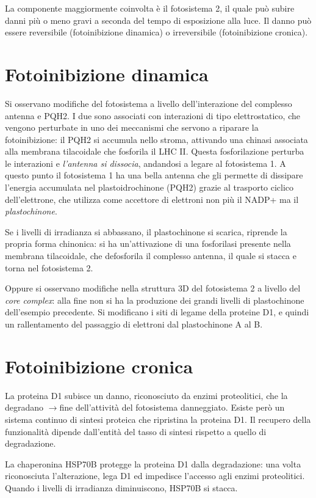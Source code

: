 \documentclass[a4paper,12pt]{book}
\newcommand{\lfreccia}{\ensuremath{\longrightarrow}}
\begin{document}
La componente maggiormente coinvolta è il fotosistema 2, il quale può subire danni più o meno gravi a seconda del tempo di esposizione alla luce. Il danno può essere reversibile (fotoinibizione dinamica) o irreversibile (fotoinibizione cronica).

\section{Fotoinibizione dinamica}
Si osservano modifiche del fotosistema a livello dell'interazione del complesso antenna e PQH2. I due sono associati con interazioni di tipo elettrostatico, che vengono perturbate in uno dei meccanismi che servono a riparare la fotoinibizione: il PQH2 si accumula nello stroma, attivando una chinasi associata alla membrana tilacoidale che fosforila il LHC II. Questa fosforilazione perturba le interazioni e \emph{l'antenna si dissocia}, andandosi a legare al fotosistema 1. A questo punto il fotosistema 1 ha una bella antenna che gli permette di dissipare l'energia accumulata nel plastoidrochinone (PQH2) grazie al trasporto ciclico dell'elettrone, che utilizza come accettore di elettroni non più il NADP+ ma il \emph{plastochinone}.

Se i livelli di irradianza si abbassano, il plastochinone si scarica, riprende la propria forma chinonica: si ha un'attivazione di una fosforilasi presente nella membrana tilacoidale, che defosforila il complesso antenna, il quale si stacca e torna nel fotosistema 2.

Oppure si osservano modifiche nella struttura 3D del fotosistema 2 a livello del \emph{core complex}: alla fine non si ha la produzione dei grandi livelli di plastochinone dell'esempio precedente. Si modificano i siti di legame della proteine D1, e quindi un rallentamento del passaggio di elettroni dal plastochinone A al B.

\section{Fotoinibizione cronica}
La proteina D1 subisce un danno, riconosciuto da enzimi proteolitici, che la degradano \lfreccia fine dell'attività del fotosistema danneggiato. Esiste però un sistema continuo di sintesi proteica che ripristina la proteina D1. Il recupero della funzionalità dipende dall'entità del tasso di sintesi rispetto a quello di degradazione.

La chaperonina HSP70B protegge la proteina D1 dalla degradazione: una volta riconosciuta l'alterazione, lega D1 ed impedisce l'accesso agli enzimi proteolitici. Quando i livelli di irradianza diminuiscono, HSP70B si stacca.
\end{document}
